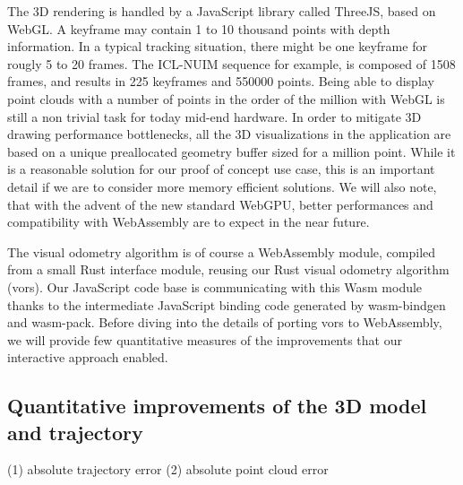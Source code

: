 The 3D rendering is handled by a JavaScript library called ThreeJS, based on WebGL.
A keyframe may contain 1 to 10 thousand points with depth information.
In a typical tracking situation, there might be one keyframe for rougly 5 to 20 frames.
The ICL-NUIM sequence for example, is composed of 1508 frames,
and results in 225 keyframes and 550000 points.
Being able to display point clouds with a number of points in the order of the million
with WebGL is still a non trivial task for today mid-end hardware.
In order to mitigate 3D drawing performance bottlenecks,
all the 3D visualizations in the application are based on a unique preallocated
geometry buffer sized for a million point.
While it is a reasonable solution for our proof of concept use case,
this is an important detail if we are to consider more memory efficient solutions.
We will also note, that with the advent of the new standard WebGPU,
better performances and compatibility with WebAssembly are to expect in the near future.

The visual odometry algorithm is of course a WebAssembly module,
compiled from a small Rust interface module,
reusing our Rust visual odometry algorithm (vors).
Our JavaScript code base is communicating with this Wasm module
thanks to the intermediate JavaScript binding code generated by wasm-bindgen and wasm-pack.
Before diving into the details of porting vors to WebAssembly,
we will provide few quantitative measures of the improvements that our interactive
approach enabled.

\subsection{Quantitative improvements of the 3D model and trajectory}%
\label{sub:quantitative-improvements}

(1) absolute trajectory error
(2) absolute point cloud error
